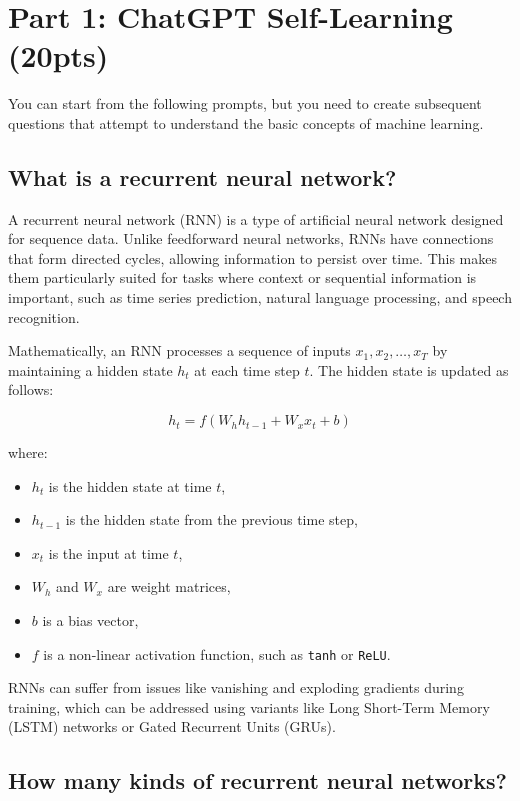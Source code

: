 \section{Part 1: ChatGPT Self-Learning (20pts)}

You can start from the following prompts, but you need to create subsequent questions that attempt to understand the basic concepts of machine learning.

\subsection{What is a recurrent neural network?}

A recurrent neural network (RNN) is a type of artificial neural network designed for sequence data. Unlike feedforward neural networks, RNNs have connections that form directed cycles, allowing information to persist over time. This makes them particularly suited for tasks where context or sequential information is important, such as time series prediction, natural language processing, and speech recognition.

Mathematically, an RNN processes a sequence of inputs \( x_1, x_2, \dots, x_T \) by maintaining a hidden state \( h_t \) at each time step \( t \). The hidden state is updated as follows:

\[
h_t = f(W_h h_{t-1} + W_x x_t + b)
\]

where:
\begin{itemize}
    \item \( h_t \) is the hidden state at time \( t \),
    \item \( h_{t-1} \) is the hidden state from the previous time step,
    \item \( x_t \) is the input at time \( t \),
    \item \( W_h \) and \( W_x \) are weight matrices,
    \item \( b \) is a bias vector,
    \item \( f \) is a non-linear activation function, such as \texttt{tanh} or \texttt{ReLU}.
\end{itemize}

RNNs can suffer from issues like vanishing and exploding gradients during training, which can be addressed using variants like Long Short-Term Memory (LSTM) networks or Gated Recurrent Units (GRUs).

\subsection{How many kinds of recurrent neural networks?}

